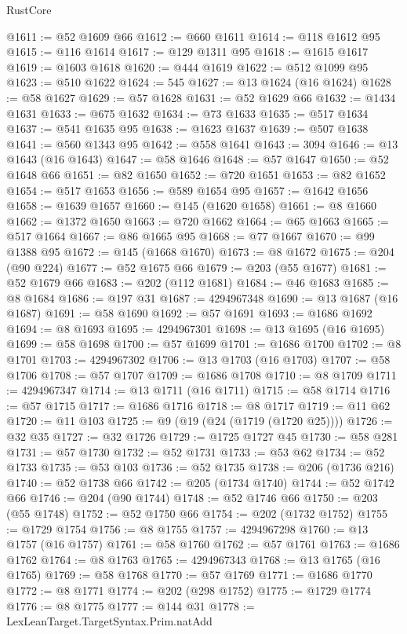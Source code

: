 \begin{lexlean}{RustCore}
\begin{coremodule}
@1611 := @52 @1609 @66
@1612 := @660 @1611
@1614 := @118 @1612 @95
@1615 := @116 @1614
@1617 := @129 @1311 @95
@1618 := @1615 @1617
@1619 := @1603 @1618
@1620 := @444 @1619
@1622 := @512 @1099 @95
@1623 := @510 @1622
@1624 := 545
@1627 := @13 @1624 (@16 @1624)
@1628 := @58 @1627
@1629 := @57 @1628
@1631 := @52 @1629 @66
@1632 := @1434 @1631
@1633 := @675 @1632
@1634 := @73 @1633
@1635 := @517 @1634
@1637 := @541 @1635 @95
@1638 := @1623 @1637
@1639 := @507 @1638
@1641 := @560 @1343 @95
@1642 := @558 @1641
@1643 := 3094
@1646 := @13 @1643 (@16 @1643)
@1647 := @58 @1646
@1648 := @57 @1647
@1650 := @52 @1648 @66
@1651 := @82 @1650
@1652 := @720 @1651
@1653 := @82 @1652
@1654 := @517 @1653
@1656 := @589 @1654 @95
@1657 := @1642 @1656
@1658 := @1639 @1657
@1660 := @145 (@1620 @1658)
@1661 := @8 @1660
@1662 := @1372 @1650
@1663 := @720 @1662
@1664 := @65 @1663
@1665 := @517 @1664
@1667 := @86 @1665 @95
@1668 := @77 @1667
@1670 := @99 @1388 @95
@1672 := @145 (@1668 @1670)
@1673 := @8 @1672
@1675 := @204 (@90 @224)
@1677 := @52 @1675 @66
@1679 := @203 (@55 @1677)
@1681 := @52 @1679 @66
@1683 := @202 (@112 @1681)
@1684 := @46 @1683
@1685 := @8 @1684
@1686 := @197 @31
@1687 := 4294967348
@1690 := @13 @1687 (@16 @1687)
@1691 := @58 @1690
@1692 := @57 @1691
@1693 := @1686 @1692
@1694 := @8 @1693
@1695 := 4294967301
@1698 := @13 @1695 (@16 @1695)
@1699 := @58 @1698
@1700 := @57 @1699
@1701 := @1686 @1700
@1702 := @8 @1701
@1703 := 4294967302
@1706 := @13 @1703 (@16 @1703)
@1707 := @58 @1706
@1708 := @57 @1707
@1709 := @1686 @1708
@1710 := @8 @1709
@1711 := 4294967347
@1714 := @13 @1711 (@16 @1711)
@1715 := @58 @1714
@1716 := @57 @1715
@1717 := @1686 @1716
@1718 := @8 @1717
@1719 := @11 @62
@1720 := @11 @103
@1725 := @9 (@19 (@24 (@1719 (@1720 @25))))
@1726 := @32 @35
@1727 := @32 @1726
@1729 := @1725 @1727 @45
@1730 := @58 @281
@1731 := @57 @1730
@1732 := @52 @1731
@1733 := @53 @62
@1734 := @52 @1733
@1735 := @53 @103
@1736 := @52 @1735
@1738 := @206 (@1736 @216)
@1740 := @52 @1738 @66
@1742 := @205 (@1734 @1740)
@1744 := @52 @1742 @66
@1746 := @204 (@90 @1744)
@1748 := @52 @1746 @66
@1750 := @203 (@55 @1748)
@1752 := @52 @1750 @66
@1754 := @202 (@1732 @1752)
@1755 := @1729 @1754
@1756 := @8 @1755
@1757 := 4294967298
@1760 := @13 @1757 (@16 @1757)
@1761 := @58 @1760
@1762 := @57 @1761
@1763 := @1686 @1762
@1764 := @8 @1763
@1765 := 4294967343
@1768 := @13 @1765 (@16 @1765)
@1769 := @58 @1768
@1770 := @57 @1769
@1771 := @1686 @1770
@1772 := @8 @1771
@1774 := @202 (@298 @1752)
@1775 := @1729 @1774
@1776 := @8 @1775
@1777 := @144 @31
@1778 := LexLeanTarget.TargetSyntax.Prim.natAdd

\end{coremodule}
\end{lexlean}
